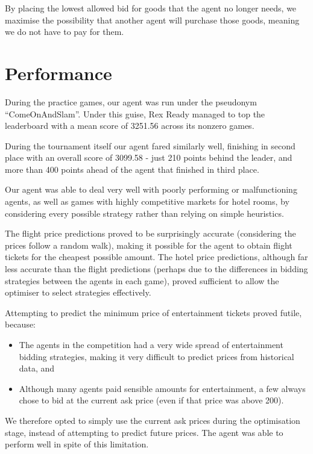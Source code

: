 \documentclass[a4paper]{proc}
\begin{document}
By placing the lowest allowed bid for goods that the agent no longer needs, we maximise the possibility that another agent will purchase those goods, meaning we do not have to pay for them.

\section{Performance}

During the practice games, our agent was run under the pseudonym ``ComeOnAndSlam''. Under this guise, Rex Ready managed to top the leaderboard with a mean score of 3251.56 across its nonzero games.

During the tournament itself our agent fared similarly well, finishing in second place with an overall score of 3099.58 - just 210 points behind the leader, and more than 400 points ahead of the agent that finished in third place.

Our agent was able to deal very well with poorly performing or malfunctioning agents, as well as games with highly competitive markets for hotel rooms, by considering every possible strategy rather than relying on simple heuristics.

The flight price predictions proved to be surprisingly accurate (considering the prices follow a random walk), making it possible for the agent to obtain flight tickets for the cheapest possible amount. The hotel price predictions, although far less accurate than the flight predictions (perhaps due to the differences in bidding strategies between the agents in each game), proved sufficient to allow the optimiser to select strategies effectively.

Attempting to predict the minimum price of entertainment tickets proved futile, because:

\begin{itemize}
  \item The agents in the competition had a very wide spread of entertainment bidding strategies, making it very difficult to predict prices from historical data, and
  \item Although many agents paid sensible amounts for entertainment, a few always chose to bid at the current ask price (even if that price was above 200).
\end{itemize}

We therefore opted to simply use the current ask prices during the optimisation stage, instead of attempting to predict future prices. The agent was able to perform well in spite of this limitation.
\end{document}
